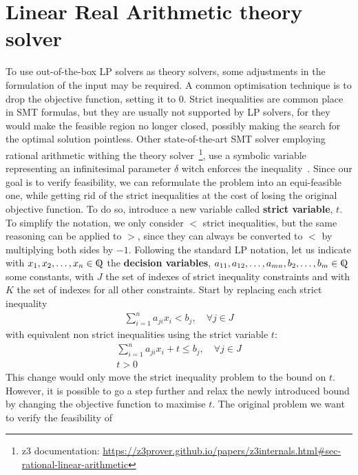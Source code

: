 \documentclass[runningheads]{llncs}
\begin{document}
\section{Linear Real Arithmetic theory solver}

To use out-of-the-box LP solvers as theory solvers, some adjustments in the formulation of the input may be required.
A common optimisation technique is to drop the objective function, setting it to $0$.
Strict inequalities are common place in SMT formulas, but they are usually not supported by LP solvers, for they would make the feasible region no longer closed, possibly making the search for the optimal solution pointless.
Other state-of-the-art SMT solver employing rational arithmetic withing the theory solver~\footnote{z3 documentation: \url{https://z3prover.github.io/papers/z3internals.html\#sec-rational-linear-arithmetic}}, use a symbolic variable representing an infinitesimal parameter $\delta$ witch enforces the inequality~\cite{ref:lra-dpll-t}.
Since our goal is to verify feasibility, we can reformulate the problem into an equi-feasible one, while getting rid of the strict inequalities at the cost of losing the original objective function.
To do so, introduce a new variable called \textbf{strict variable}, $t$.
To simplify the notation, we only consider $<$ strict inequalities, but the same reasoning can be applied to $>$, since they can always be converted to $<$ by multiplying both sides by $-1$.
Following the standard LP notation, let us indicate with $x_1, x_2, \ldots, x_n \in \bbbq$ the \textbf{decision variables}, $a_{11}, a_{12}, \ldots, a_{mn}, b_{2}, \ldots, b_{m}\in \bbbq$ some constants, with $J$ the set of indexes of strict inequality constraints and with $K$ the set of indexes for all other constraints.
Start by replacing each strict inequality
\begin{align*}
    \sum_{i=1}^{n} a_{ji}x_{i} < b_j, \quad \forall j \in J
\end{align*}
with equivalent non strict inequalities using the strict variable $t$:
\begin{align*}
    \sum_{i=1}^{n} a_{ji}x_{i} + t \le b_j, \quad \forall j \in J \\
    t > 0
\end{align*}
This change would only move the strict inequality problem to the bound on $t$.
However, it is possible to go a step further and relax the newly introduced bound by changing the objective function to maximise $t$.
The original problem we want to verify the feasibility of
\end{document}
